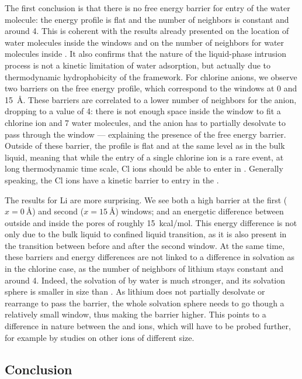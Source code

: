 \documentclass[thesis]{subfiles}
\begin{document}
The first conclusion is that there is no free energy barrier for entry of the
water molecule: the energy profile is flat and the number of neighbors is
constant and around 4. This is coherent with the results already presented on
the location of water molecules inside the  windows and on the number of
neighbors for water molecules inside . It also confirms that the nature of
the liquid-phase intrusion process is not a kinetic limitation of water
adsorption, but actually due to thermodynamic hydrophobicity of the framework.
For chlorine anions, we observe two barriers on the free energy profile, which
correspond to the  windows at 0 and \SI{15}{\angstrom}. These barriers are
correlated to a lower number of neighbors for the anion, dropping to a value of
4: there is not enough space inside the window to fit a chlorine ion and 7 water
molecules, and the anion has to partially desolvate to pass through the window
--- explaining the presence of the free energy barrier.  Outside of these
barrier, the profile is flat and at the same level as in the bulk liquid,
meaning that while the entry of a single chlorine ion is a rare event, at long
thermodynamic time scale, Cl ions should be able to enter in . Generally
speaking, the Cl ions have a kinetic barrier to entry in the .

The results for Li are more surprising. We see both a high barrier at the first
($x=\SI{0}{\angstrom}$) and second ($x=\SI{15}{\angstrom}$) windows; and an
energetic difference between outside and inside the pores of roughly
\SI{15}{kcal/mol}. This energy difference is not only due to the bulk liquid to
confined liquid transition, as it is also present in the transition between
before and after the second window. At the same time, these barriers and energy
differences are not linked to a difference in solvation as in the chlorine case,
as the number of neighbors of lithium stays constant and around 4. Indeed, the
solvation of  by water is much stronger, and its solvation sphere is
smaller in size than . As lithium does not partially desolvate or
rearrange to pass the barrier, the whole solvation sphere needs to go though a
relatively small window, thus making the barrier higher. This points to a
difference in nature between the  and  ions, which will have to
be probed further, for example by studies on other ions of different size.

\subsection{Conclusion}
\end{document}
